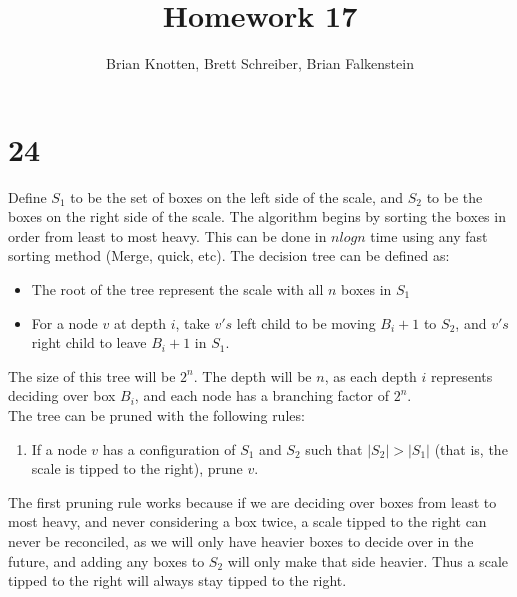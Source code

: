 \documentclass[letterpaper,notitlepage,twoside]{article}
\begin{document}
\title{Homework 17}
\author{Brian Knotten, Brett Schreiber, Brian Falkenstein}
\maketitle

\section*{24}
Define $S_1$ to be the set of boxes on the left side of the scale, and $S_2$ to be the boxes on the right side of the scale. The algorithm begins by sorting the boxes in order from least to most heavy. This can be done in $nlogn$ time using any fast sorting method (Merge, quick, etc). 
The decision tree can be defined as:
\begin{itemize}
\item The root of the tree represent the scale with all $n$ boxes in $S_1$
\item For a node $v$ at depth $i$, take $v's$ left child to be moving $B_i+1$ to $S_2$, and $v's$ right child to leave $B_i+1$ in $S_1$. 
\end{itemize}
The size of this tree will be $2^n$. The depth will be $n$, as each depth $i$ represents deciding over box $B_i$, and each node has a branching factor of $2^n$. \\
The tree can be pruned with the following rules:
\begin{enumerate}
\item If a node $v$ has a configuration of $S_1$ and $S_2$ such that $|S_2|>|S_1|$ (that is, the scale is tipped to the right), prune $v$. 
\end{enumerate}
The first pruning rule works because if we are deciding over boxes from least to most heavy, and never considering a box twice, a scale tipped to the right can never be reconciled, as we will only have heavier boxes to decide over in the future, and adding any boxes to $S_2$ will only make that side heavier. Thus a scale tipped to the right will always stay tipped to the right. 
\end{document}
